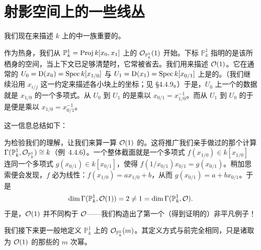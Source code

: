
\section{射影空间上的一些线丛}

我们现在来描述\trField{} $k$ 上的\trProjectiveSpace{}中一族重要的\trInvertibleSheaf。

作为热身，我们从 $\mathbb{P}^1_k=\operatorname{Proj} k[x_0,x_1]$ 上的\trInvertibleSheaf{} $\mathcal{O}_{\mathbb{P}^1_k}(1)$ 开始。下标 $\mathbb{P}^1_k$ 指明的是该\trSheaf{}所栖身的空间，当上下文已足够清楚时，它常被省去。我们用\trTransitionFunction{}来描述\trInvertibleSheaf{} $\mathcal{O}(1)$。它在通常的\trAffine\trOpenSet{} $U_0=\mathrm{D}(x_0)=\operatorname{Spec} k[x_{1/0}]$ 与 $U_1=\mathrm{D}(x_1)=\operatorname{Spec} k[x_{0/1}]$ 上是\trTrivial{}的。（我们继续沿用 $x_{i/j}$ 这一约定来描述\trProjectiveSpace{}各小块上的坐标；见 \S4.4.9。）于是，$U_0$ 上一个\trSection{}的数据就是 $x_{1/0}$ 的一个多项式。从 $U_0$ 到 $U_1$ 的\trTransitionFunction{}是乘以 $x_{0/1}=x_{1/0}^{-1}$。而从 $U_1$ 到 $U_0$ 的\trTransitionFunction{}于是便是乘以 $x_{1/0}=x_{0/1}^{-1}$。

这一信息总结如下：
\begin{center}
\end{center}

为检验我们的理解，让我们来算一算 $\mathcal{O}(1)$ 的\trGlobalSections。这将推广我们亲手做过的那个计算 $\Gamma(\mathbb{P}^1_k,\mathcal{O}_{\mathbb{P}^1_k})\cong k$（\mbox{例~4.4.6}）。一个整体截面就是一个多项式 $f(x_{1/0})\in k[x_{1/0}]$ 连同一个多项式 $g(x_{0/1})\in k[x_{0/1}]$，使得 $f(1/x_{0/1})x_{0/1}=g(x_{0/1})$。稍加思索便会发现，$f$ 必为线性：$f(x_{1/0})=ax_{1/0}+b$，从而 $g(x_{0/1})=a+bx_{0/1}$。于是
\[
\dim\Gamma(\mathbb{P}^1_k,\mathcal{O}(1))=2\ne 1=\dim\Gamma(\mathbb{P}^1_k,\mathcal{O}).
\]
于是，$\mathcal{O}(1)$ 并不同构于 $\mathcal{O}$——我们构造出了第一个（得到证明的）非平凡\trLineBundle{}例子！

我们接下来更一般地定义 $\mathbb{P}^1_k$ 上的 $\mathcal{O}_{\mathbb{P}^1_k}(m)$。其定义方式与前完全相同，只是诸\trTransitionFunction{}取为 $\mathcal{O}(1)$ 的那些\trTransitionFunction{}的 $m$ 次幂。
\begin{center}
\end{center}

